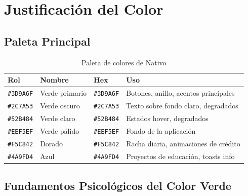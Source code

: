 \documentclass[12pt, a4paper]{article}
\begin{document}
\newpage
\section{Justificación del Color}

\subsection{Paleta Principal}

\begin{table}[H]
\centering
\caption{Paleta de colores de Nativo}
\begin{tabularx}{\textwidth}{lllX}
\toprule
\textbf{Rol} & \textbf{Nombre} & \textbf{Hex} & \textbf{Uso} \\
\midrule
\colorbox{nativoPrimary}{\color{white}\texttt{\#3D9A6F}} & Verde primario & \texttt{\#3D9A6F} & Botones, anillo, acentos principales \\
\colorbox{nativoDark}{\color{white}\texttt{\#2C7A53}} & Verde oscuro & \texttt{\#2C7A53} & Texto sobre fondo claro, degradados \\
\colorbox{nativoLight}{\color{white}\texttt{\#52B484}} & Verde claro & \texttt{\#52B484} & Estados hover, degradados \\
\colorbox{nativoPale}{\color{nativoText}\texttt{\#EEF5EF}} & Verde pálido & \texttt{\#EEF5EF} & Fondo de la aplicación \\
\colorbox[HTML]{F5C842}{\color{black}\texttt{\#F5C842}} & Dorado & \texttt{\#F5C842} & Racha diaria, animaciones de crédito \\
\colorbox[HTML]{4A9FD4}{\color{white}\texttt{\#4A9FD4}} & Azul & \texttt{\#4A9FD4} & Proyectos de educación, toasts info \\
\bottomrule
\end{tabularx}
\end{table}

\subsection{Fundamentos Psicológicos del Color Verde}
\end{document}
